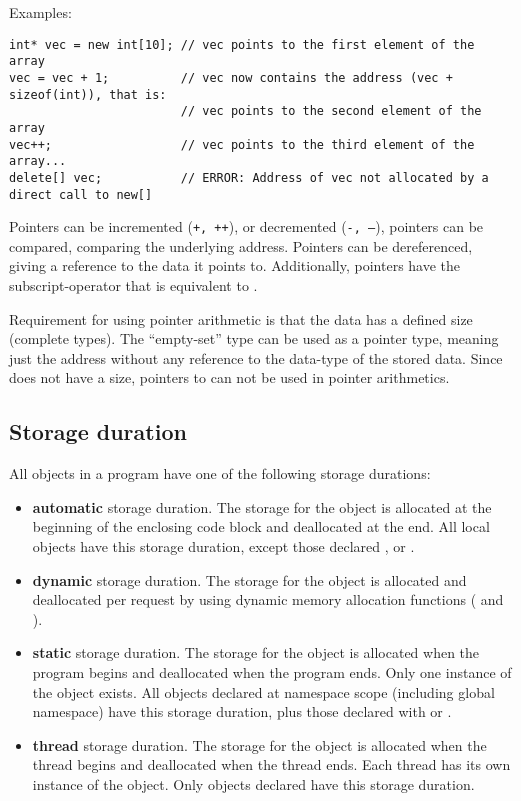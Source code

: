 Examples:
\begin{verbatim}
int* vec = new int[10]; // vec points to the first element of the array
vec = vec + 1;          // vec now contains the address (vec + sizeof(int)), that is:
                        // vec points to the second element of the array
vec++;                  // vec points to the third element of the array...
delete[] vec;           // ERROR: Address of vec not allocated by a direct call to new[]
\end{verbatim}

Pointers can be incremented (\texttt{+, ++}), or decremented (\texttt{-, --}), pointers can be compared, comparing the underlying address.
Pointers can be dereferenced, giving a reference to the data it points to. Additionally, pointers have the subscript-operator \cpp{[n]} that is
equivalent to .

Requirement for using pointer arithmetic is that the data has a defined size (complete types). The ``empty-set'' type  can be used as a pointer type,
meaning just the address without any reference to the data-type of the stored data. Since  does not have a size, pointers to  can not
be used in pointer arithmetics.


\subsection{Storage duration}
All objects in a program have one of the following storage durations:
\begin{itemize}
  \item \textbf{automatic} storage duration. The storage for the object is allocated at the beginning of the enclosing code block and deallocated at the end. All local objects have this storage duration, except those declared ,  or .

  \item \textbf{dynamic} storage duration. The storage for the object is allocated and deallocated per request by using dynamic memory allocation functions ( and ).

  \item \textbf{static} storage duration. The storage for the object is allocated when the program begins and deallocated when the program ends. Only one instance of the object exists. All objects declared at namespace scope (including global namespace) have this storage duration, plus those declared with  or .

  \item \textbf{thread} storage duration. The storage for the object is allocated when the thread begins and deallocated when the thread ends. Each thread has its own instance of the object. Only objects declared  have this storage duration.
\end{itemize}

